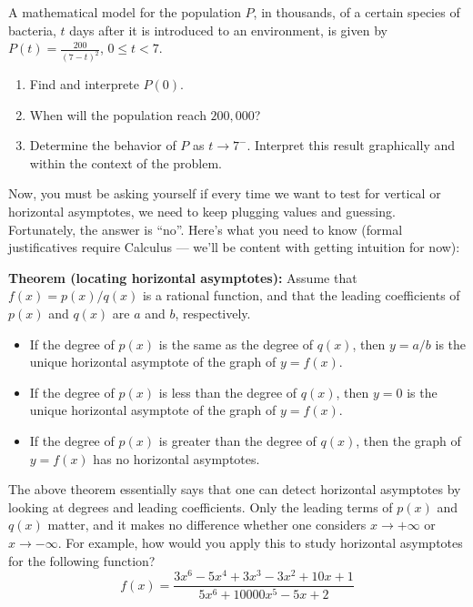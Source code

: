 \documentclass{ximera}
\begin{document}
\begin{exploration}
  A mathematical model for the population $P$, in thousands, of a certain species of bacteria, $t$ days after it is introduced to an environment, is given by $P(t) = \frac{200}{(7-t)^2}$, $0 \leq t < 7$.
  \begin{enumerate}
  \item Find and interprete $P(0)$.
  \item When will the population reach $200,000$?
  \item Determine the behavior of $P$ as $t \to 7^-$. Interpret this result graphically and within the context of the problem.
  \end{enumerate}
\end{exploration}

Now, you must be asking yourself if every time we want to test for vertical or horizontal asymptotes, we need to keep plugging values and guessing. Fortunately, the answer is ``no''. Here's what you need to know (formal justificatives require Calculus --- we'll be content with getting intuition for now):

\begin{callout}
  {\bf Theorem (locating horizontal asymptotes):} Assume that $f(x) = p(x)/q(x)$ is a rational function, and that the leading coefficients of $p(x)$ and $q(x)$ are $a$ and $b$, respectively.
  \begin{itemize}
  \item If the degree of $p(x)$ is the same as the degree of $q(x)$, then $y=a/b$ is the unique horizontal asymptote of the graph of $y=f(x)$.
  \item If the degree of $p(x)$ is less than the degree of $q(x)$, then $y=0$ is the unique horizontal asymptote of the graph of $y=f(x)$.
  \item If the degree of $p(x)$ is greater than the degree of $q(x)$, then the graph of $y=f(x)$ has no horizontal asymptotes.
  \end{itemize}
\end{callout}


The above theorem essentially says that one can detect horizontal asymptotes by looking at degrees and leading coefficients. Only the leading terms of $p(x)$ and $q(x)$ matter, and it makes no difference whether one considers $x\to +\infty$ or $x\to -\infty$. For example, how would you apply this to study horizontal asymptotes for the following function? \[ f(x) =  \frac{3x^6-5x^4+3x^3-3x^2 + 10x + 1}{5x^6 + 10000x^5 - 5x+2}\]
\end{document}

